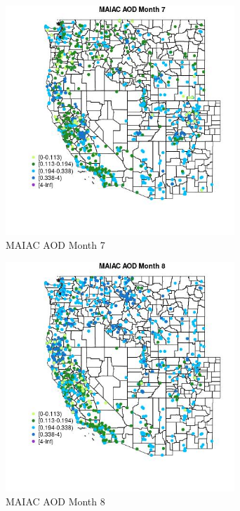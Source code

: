 \begin{figure} 
\centering  
\includegraphics[width=0.77\textwidth]{Code_Outputs/Report_ML_input_PM25_Step4_part_f_de_duplicated_aveswNAs_MapObsMo7MAIAC_AOD.jpg} 
\caption{\label{fig:Report_ML_input_PM25_Step4_part_f_de_duplicated_aveswNAsMapObsMo7MAIAC_AOD}MAIAC AOD Month 7} 
\end{figure} 
 

\begin{figure} 
\centering  
\includegraphics[width=0.77\textwidth]{Code_Outputs/Report_ML_input_PM25_Step4_part_f_de_duplicated_aveswNAs_MapObsMo8MAIAC_AOD.jpg} 
\caption{\label{fig:Report_ML_input_PM25_Step4_part_f_de_duplicated_aveswNAsMapObsMo8MAIAC_AOD}MAIAC AOD Month 8} 
\end{figure} 
 

